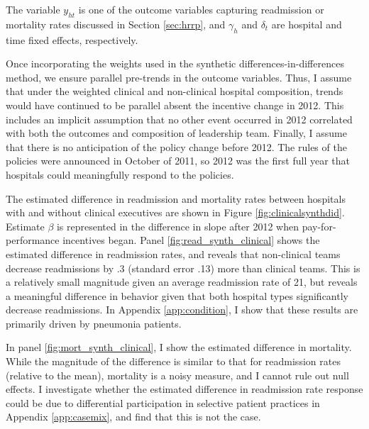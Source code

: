 \documentclass[12pt]{article}
\begin{document}
    \noindent The variable $y_{ht}$ is one of the outcome variables capturing readmission or mortality rates discussed in Section \ref{sec:hrrp}, and $\gamma_h$ and $\delta_t$ are hospital and time fixed effects, respectively. 

    Once incorporating the weights used in the synthetic differences-in-differences method, we ensure parallel pre-trends in the outcome variables. Thus, I assume that under the weighted clinical and non-clinical hospital composition, trends would have continued to be parallel absent the incentive change in 2012. This includes an implicit assumption that no other event occurred in 2012 correlated with both the outcomes and composition of leadership team. Finally, I assume that there is no anticipation of the policy change before 2012. The rules of the policies were announced in October of 2011, so 2012 was the first full year that hospitals could meaningfully respond to the policies.

    The estimated difference in readmission and mortality rates between hospitals with and without clinical executives are shown in Figure \ref{fig:clinicalsynthdid}. Estimate $\beta$ is represented in the difference in slope after 2012 when pay-for-performance incentives began. Panel \ref{fig:read_synth_clinical} shows the estimated difference in readmission rates, and reveals that non-clinical teams decrease readmissions by .3 (standard error .13) more than clinical teams. This is a relatively small magnitude given an average readmission rate of 21, but reveals a meaningful difference in behavior given that both hospital types significantly decrease readmissions. In Appendix \ref{app:condition}, I show that these results are primarily driven by pneumonia patients. 
    
    In panel \ref{fig:mort_synth_clinical}, I show the estimated difference in mortality. While the magnitude of the difference is similar to that for readmission rates (relative to the mean), mortality is a noisy measure, and I cannot rule out null effects. I investigate whether the estimated difference in readmission rate response could be due to differential participation in selective patient practices in Appendix \ref{app:casemix}, and find that this is not the case. 
\end{document}
